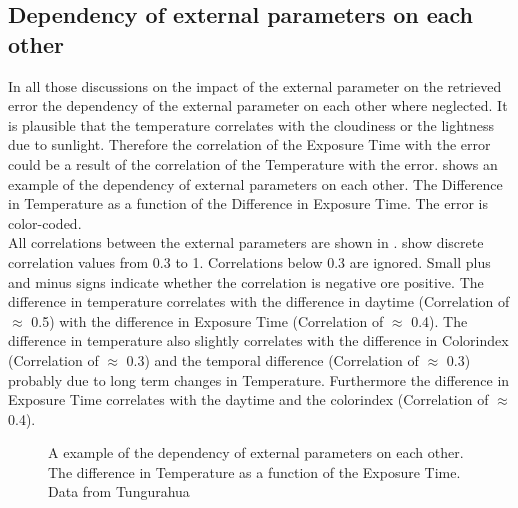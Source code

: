 \documentclass  [
  paper    = a4,
  BCOR     = 10mm,
  twoside,
  fontsize = 12pt,
  fleqn,
  toc      = bibnumbered,
  toc      = listofnumbered,
  numbers  = noendperiod,
  headings = normal,
  listof   = leveldown,
  version  = 3.03
]                                       {scrreprt}
\begin{document}
	\subsection*{Dependency of external parameters on each other}
	In all those discussions on the impact of the external parameter on the retrieved   error the  dependency of the external parameter on each other where neglected. It is plausible that the temperature correlates with the cloudiness or the lightness due to sunlight. Therefore the correlation of the Exposure Time with the   error could be a result of the correlation of the Temperature with the   error.  shows an example of the dependency of external parameters on each other. The Difference in Temperature as a function of the Difference in Exposure Time. The   error is color-coded. \\
	All correlations between the external parameters are shown in .  show discrete correlation values from 0.3 to 1. Correlations below 0.3 are ignored. Small plus and minus signs indicate whether the correlation is negative ore positive. 
	The difference in temperature correlates with the difference in daytime (Correlation of $\approx$ 0.5) with the difference in Exposure Time (Correlation of $\approx$ 0.4). The difference in temperature also slightly correlates with the difference in Colorindex (Correlation of $\approx$ 0.3) and the temporal difference (Correlation of $\approx$ 0.3) probably due to long term changes in Temperature. Furthermore the difference in Exposure Time correlates with the daytime and the colorindex (Correlation of $\approx$ 0.4).\\
	\begin{figure}
		\centering
		\caption{A example of the dependency of external parameters on each other. The difference in Temperature as a function of the Exposure Time. Data from Tungurahua}
		\label{fig:difference-in-exposure-time-msdifference-in-temperature-ctungu}
	\end{figure}
\end{document}

